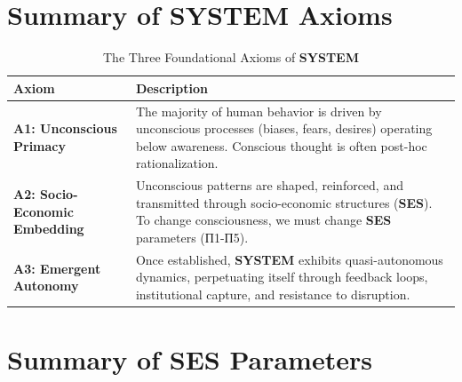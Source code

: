 \documentclass[11pt,a4paper]{article}
\newcommand{\SYSTEM}{\textbf{SYSTEM}}
\newcommand{\SES}{\textbf{SES}}
\theoremstyle{definition}
\theoremstyle{remark}
\begin{document}
\newpage



\newpage
\appendix

\section{Summary of \SYSTEM{} Axioms}

\begin{table}[H]
\centering
\caption{The Three Foundational Axioms of \SYSTEM{}}
\begin{tabular}{@{}p{}p{}@{}}
\toprule
\textbf{Axiom} & \textbf{Description} \\ \midrule
\textbf{A1: Unconscious Primacy} & The majority of human behavior is driven by unconscious processes (biases, fears, desires) operating below awareness. Conscious thought is often post-hoc rationalization. \\[0.3cm]
\textbf{A2: Socio-Economic Embedding} & Unconscious patterns are shaped, reinforced, and transmitted through socio-economic structures (\SES{}). To change consciousness, we must change \SES{} parameters (П1-П5). \\[0.3cm]
\textbf{A3: Emergent Autonomy} & Once established, \SYSTEM{} exhibits quasi-autonomous dynamics, perpetuating itself through feedback loops, institutional capture, and resistance to disruption. \\ \bottomrule
\end{tabular}
\end{table}

\section{Summary of \SES{} Parameters}
\end{document}

